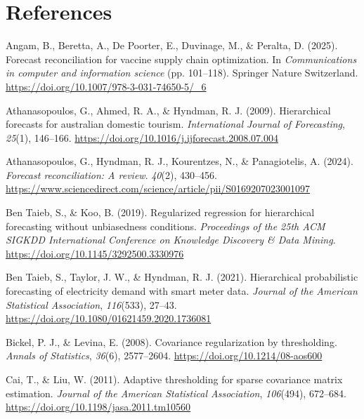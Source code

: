 \documentclass[
  11pt,
  letterpaper,
  DIV=11,
  numbers=noendperiod,
  titlepage]{scrartcl}
\newlength{\cslhangindent}
\newenvironment{CSLReferences}[2] %
 {\begin{list}{}{%
  \setlength{\itemindent}{0pt}
  \setlength{\leftmargin}{0pt}
  \setlength{\parsep}{0pt}
  \ifodd #1
   \setlength{\leftmargin}{\cslhangindent}
   \setlength{\itemindent}{-1\cslhangindent}
  \fi
  \setlength{\itemsep}{#2\baselineskip}}}
 {\end{list}}
\begin{document}
\endgroup{}

\pagebreak

\section*{References}\label{references}

\label{refs}
\begin{CSLReferences}{1}{0}
Angam, B., Beretta, A., De Poorter, E., Duvinage, M., \& Peralta, D.
(2025). Forecast reconciliation for vaccine supply chain optimization.
In \emph{Communications in computer and information science} (pp.
101--118). Springer Nature Switzerland.
\url{https://doi.org/10.1007/978-3-031-74650-5/_6}

Athanasopoulos, G., Ahmed, R. A., \& Hyndman, R. J. (2009). Hierarchical
forecasts for australian domestic tourism. \emph{International Journal
of Forecasting}, \emph{25}(1), 146--166.
\url{https://doi.org/10.1016/j.ijforecast.2008.07.004}

Athanasopoulos, G., Hyndman, R. J., Kourentzes, N., \& Panagiotelis, A.
(2024). \emph{Forecast reconciliation: A review}. \emph{40}(2),
430--456.
\url{https://www.sciencedirect.com/science/article/pii/S0169207023001097}

Ben Taieb, S., \& Koo, B. (2019). Regularized regression for
hierarchical forecasting without unbiasedness conditions.
\emph{Proceedings of the 25th ACM SIGKDD International Conference on
Knowledge Discovery \& Data Mining}.
\url{https://doi.org/10.1145/3292500.3330976}

Ben Taieb, S., Taylor, J. W., \& Hyndman, R. J. (2021). Hierarchical
probabilistic forecasting of electricity demand with smart meter data.
\emph{Journal of the American Statistical Association}, \emph{116}(533),
27--43. \url{https://doi.org/10.1080/01621459.2020.1736081}

Bickel, P. J., \& Levina, E. (2008). Covariance regularization by
thresholding. \emph{Annals of Statistics}, \emph{36}(6), 2577--2604.
\url{https://doi.org/10.1214/08-aos600}

Cai, T., \& Liu, W. (2011). Adaptive thresholding for sparse covariance
matrix estimation. \emph{Journal of the American Statistical
Association}, \emph{106}(494), 672--684.
\url{https://doi.org/10.1198/jasa.2011.tm10560}


\end{CSLReferences}
\end{document}
